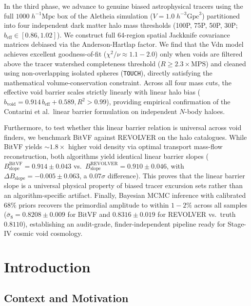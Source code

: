 \documentclass[12pt]{report}
\begin{document}
In the third phase, we advance to genuine biased astrophysical tracers using the full $1000\;h^{-1}\mathrm{Mpc}$ box of the Aletheia simulation ($V = 1.0\;h^{-3}\mathrm{Gpc}^3$) partitioned into four independent dark matter halo mass thresholds (100P, 75P, 50P, 30P; $b_{\mathrm{eff}} \in [0.86, 1.02]$). We construct full 64-region spatial Jackknife covariance matrices debiased via the Anderson-Hartlap factor. We find that the Vdn model achieves excellent goodness-of-fit ($\chi^2/\nu \approx 1.1 - 2.0$) only when voids are filtered above the tracer watershed completeness threshold ($R \ge 2.3 \times \mathrm{MPS}$) and cleaned using non-overlapping isolated spheres (\texttt{TOUCH}), directly satisfying the mathematical volume-conservation constraint. Across all four mass cuts, the effective void barrier scales strictly linearly with linear halo bias ($b_{\mathrm{void}} = 0.914\,b_{\mathrm{eff}} + 0.589, R^2 > 0.99$), providing empirical confirmation of the Contarini et al.\ linear barrier formulation on independent $N$-body haloes. 

Furthermore, to test whether this linear barrier relation is universal across void finders, we benchmark BitVF against REVOLVER on the halo catalogues. While BitVF yields $\sim 1.8\times$ higher void density via optimal transport mass-flow reconstruction, both algorithms yield identical linear barrier slopes ($B_{\mathrm{slope}}^{\mathrm{BitVF}} = 0.914 \pm 0.043$ vs.\ $B_{\mathrm{slope}}^{\mathrm{REVOLVER}} = 0.910 \pm 0.046$, with $\Delta B_{\mathrm{slope}} = -0.005 \pm 0.063$, a $0.07\sigma$ difference). This proves that the linear barrier slope is a universal physical property of biased tracer excursion sets rather than an algorithm-specific artifact. Finally, Bayesian MCMC inference with calibrated 68\% priors recovers the primordial amplitude to within $1-2\%$ across all samples ($\bar{\sigma}_8 = 0.8208 \pm 0.009$ for BitVF and $0.8316 \pm 0.019$ for REVOLVER vs.\ truth $0.8110$), establishing an audit-grade, finder-independent pipeline ready for Stage-IV cosmic void cosmology.


\chapter{Introduction}

\section{Context and Motivation}
\end{document}
